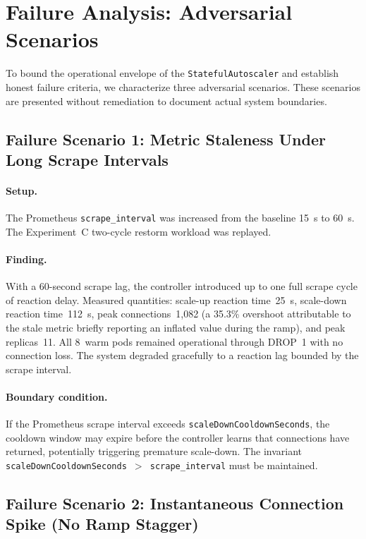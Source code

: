 \documentclass[twocolumn]{svjour3}
\begin{document}
\section{Failure Analysis: Adversarial Scenarios}
\label{sec:failure_analysis}

To bound the operational envelope of the \texttt{StatefulAutoscaler} and establish honest
failure criteria, we characterize three adversarial scenarios. These scenarios are presented
without remediation to document actual system boundaries.

\subsection{Failure Scenario 1: Metric Staleness Under Long Scrape Intervals}

\paragraph{Setup.} The Prometheus \texttt{scrape\_interval} was increased from the baseline
15~s to 60~s. The Experiment~C two-cycle restorm workload was replayed.

\paragraph{Finding.} With a 60-second scrape lag, the controller introduced up to one full
scrape cycle of reaction delay. Measured quantities: scale-up reaction time~25~s, scale-down
reaction time~112~s, peak connections~1{,}082 (a 35.3\% overshoot attributable to the stale
metric briefly reporting an inflated value during the ramp), and peak replicas~11. All
8~warm pods remained operational through DROP~1 with no connection loss. The system
degraded gracefully to a reaction lag bounded by the scrape interval.

\paragraph{Boundary condition.} If the Prometheus scrape interval exceeds
\texttt{scaleDownCooldownSeconds}, the cooldown window may expire before the controller
learns that connections have returned, potentially triggering premature scale-down. The
invariant \texttt{scaleDownCooldownSeconds $>$ scrape\_interval} must be maintained.

\subsection{Failure Scenario 2: Instantaneous Connection Spike (No Ramp Stagger)}
\end{document}
